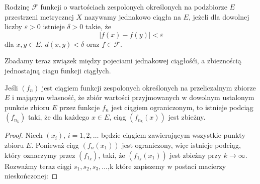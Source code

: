\documentclass[leqno]{article}
\begin{document}
\begin{justify}
\begin{defn}
    Rodzinę $\mathcal{F}$ funkcji o wartościach zespolonych określonych na podzbiorze $E$ przestrzeni metrycznej $X$ nazywamy jednakowo ciągła na $E$,
    jeżeli dla dowolnej liczby $\varepsilon > 0$ istnieje $\delta > 0$ takie, że 
    \[
        |f(x) - f(y)| < \varepsilon
    \]
    dla $x, y \in E$, $d(x, y) < \delta$ oraz $f \in \mathcal{F}$.
\end{defn}

Zbadamy teraz związek między pojeciami jednakowej ciągłośći, a zbieznością jednostajną ciagu funkcji ciągłych. 

\begin{theorem}
{
    Jeśli $(f_n)$ jest ciągiem funkcji zespolonych określonych na przeliczalnym zbiorze $E$ i mającym własność, że zbiór wartości przyjmowanych w dowolnym ustalonym punkcie zbioru $E$ przez
    funkcje $f_n$ jest ciągiem ograniczonym, to istnieje podciąg $(f_{n_k})$ taki, że dla każdego $x \in E$, ciąg $(f_{n_k}(x))$ jest zbieżny.
}
\end{theorem}

\begin{proof}
    Niech $(x_i)$, $i = 1, 2, \ldots$ będzie ciągiem zawierającym wszystkie punkty zbioru $E$.
    Ponieważ ciąg $(f_n(x_1))$ jest ograniczony, więc istnieje podciąg, który oznaczymy przez $(f_{1_k})$, taki, że
    $(f_{1_k}(x_1))$ jest zbieżny przy $k \to \infty$. Rozważmy teraz ciągi $s_1, s_2, s_3, \ldots$,k
    które zapiszemy w postaci macierzy nieskończonej:


\end{proof}
\end{justify}
\end{document}
